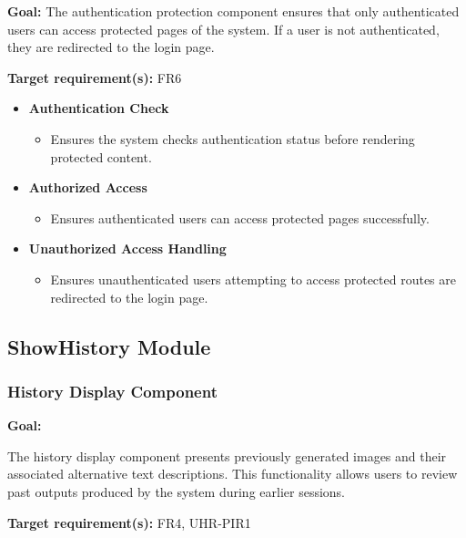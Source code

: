 \documentclass[12pt, titlepage]{article}
\begin{document}
\textbf{Goal:}
The authentication protection component ensures that only authenticated
users can access protected pages of the system. If a user is not authenticated,
they are redirected to the login page.

\textbf{Target requirement(s):} FR6

\begin{itemize}

\item \textbf{Authentication Check}
\begin{itemize}
\item Ensures the system checks authentication status before rendering protected content.
\end{itemize}

\item \textbf{Authorized Access}
\begin{itemize}
\item Ensures authenticated users can access protected pages successfully.
\end{itemize}

\item \textbf{Unauthorized Access Handling}
\begin{itemize}
\item Ensures unauthenticated users attempting to access protected routes are redirected to the login page.
\end{itemize}

\end{itemize}

\subsection{ShowHistory Module}

\subsubsection{History Display Component}

\textbf{Goal:}

The history display component presents previously generated images and their
associated alternative text descriptions. This functionality allows users to
review past outputs produced by the system during earlier sessions.

\textbf{Target requirement(s):} FR4, UHR-PIR1
\end{document}
